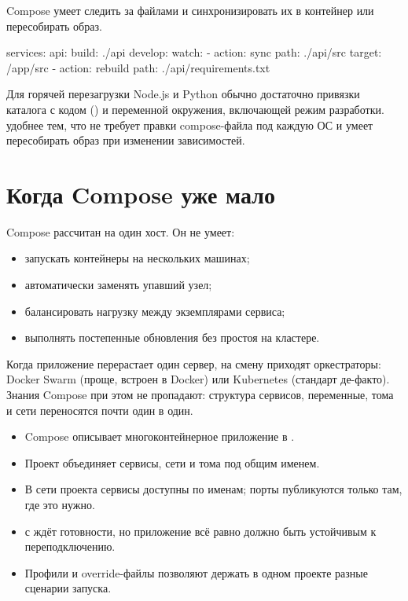 Compose умеет следить за файлами и синхронизировать их в контейнер
или пересобирать образ.

\begin{code}[language=composeyaml]
services:
  api:
    build: ./api
    develop:
      watch:
        - action: sync
          path: ./api/src
          target: /app/src
        - action: rebuild
          path: ./api/requirements.txt
\end{code}


\begin{tipbox}
Для горячей перезагрузки Node.js и Python обычно достаточно привязки
каталога с кодом () и переменной окружения, включающей
режим разработки.  удобнее тем, что не требует правки
compose-файла под каждую ОС и умеет пересобирать образ при изменении
зависимостей.
\end{tipbox}

\section{Когда Compose уже мало}

Compose рассчитан на один хост. Он не умеет:

\begin{itemize}
  \item запускать контейнеры на нескольких машинах;
  \item автоматически заменять упавший узел;
  \item балансировать нагрузку между экземплярами сервиса;
  \item выполнять постепенные обновления без простоя на кластере.
\end{itemize}

Когда приложение перерастает один сервер, на смену приходят
оркестраторы: Docker Swarm (проще, встроен в Docker) или Kubernetes
(стандарт де-факто). Знания Compose при этом не пропадают: структура
сервисов, переменные, тома и сети переносятся почти один в один.

\begin{summarybox}
\begin{itemize}
  \item Compose описывает многоконтейнерное приложение в
        .
  \item Проект объединяет сервисы, сети и тома под общим именем.
  \item В сети проекта сервисы доступны по именам; порты публикуются
        только там, где это нужно.
  \item {} с  ждёт готовности,
        но приложение всё равно должно быть устойчивым к переподключению.
  \item Профили и override-файлы позволяют держать в одном проекте
        разные сценарии запуска.
\end{itemize}
\end{summarybox}


